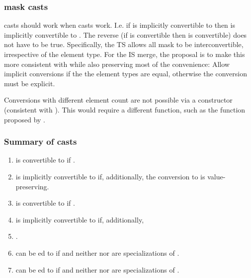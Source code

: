 \subsubsection{mask casts}
 casts should work when  casts work.
I.e. if  is implicitly convertible to 
then  is implicitly convertible to .
The reverse (if  is convertible then  is
convertible) does not have to be true.
Specifically, the TS allows all  mask to be
interconvertible, irrespective of the element type.
For the IS merge, the proposal is to make this more consistent with 
while also preserving most of the convenience:
Allow implicit conversions if the  the element types are equal,
otherwise the conversion must be explicit.

Conversions with different element count are not possible via a constructor
(consistent with ).
This would require a different function, such as the 
function proposed by \textcite{P2638R0}.

\subsubsection{Summary of casts}

\begin{enumerate}
  \item {} is convertible to  if
    .

  \item {} is implicitly convertible to 
    if, additionally, the conversion  to  is
    value-preserving.

  \item {} is convertible to  if
    .

  \item {} is implicitly convertible to
     if, additionally, \item {}.

  \item {} can be ed to  if
     and neither 
    nor  are specializations of \simdabi{}.

  \item {} can be ed to  if
     and neither
     nor  are specializations of \simdabi{}.
\end{enumerate}

